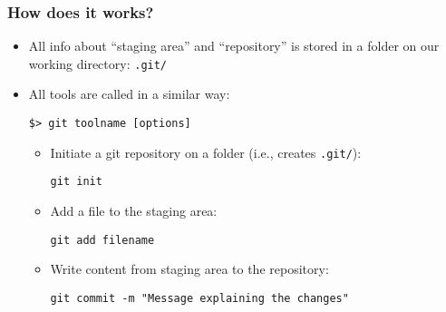 \documentclass[xcolor=dvipsnames,10pt]{beamer}
\begin{document}
\begin{frame}
 \frametitle{How does it works?}

\begin{itemize}
 \item All info about ``staging area'' and ``repository'' is stored in a folder on our working directory: {\color{blue}\texttt{.git/}}
 \vspace*{0.3cm}
 
 \item All tools are called in a similar way:
  \vspace*{0.1cm}

  \texttt{\$> {\color{blue}git toolname [options]}}
  \vspace*{0.2cm}
  
  \begin{itemize}
   \item Initiate a git repository on a folder (i.e., creates \texttt{.git/}):
   
   \texttt{git init}
   \vspace*{0.1cm}
   
   \item Add a file to the staging area:
   
   \texttt{git add filename}
   \vspace*{0.1cm}
   
   \item Write content from staging area to the repository:
   
   \texttt{git commit -m "Message explaining the changes"}
  
  \end{itemize}
  
\end{itemize}

\end{frame}
\end{document}
